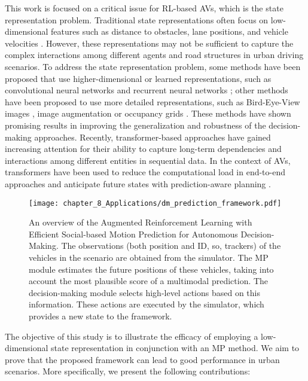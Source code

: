 This work is focused on a critical issue for RL-based AVs, which is the state representation problem. Traditional state representations often focus on low-dimensional features such as distance to obstacles, lane positions, and vehicle velocities \cite{Rodrigo2023}. However, these representations may not be sufficient to capture the complex interactions among different agents and road structures in urban driving scenarios. To address the state representation problem, some methods have been proposed that use higher-dimensional or learned representations, such as convolutional neural networks \cite{Johan2018} and recurrent neural networks \cite{Tram2018}; other methods have been proposed to use more detailed representations, such as  Bird-Eye-View images \cite{zhang2021endtoend}, image augmentation \cite{kostrikov2021image} or occupancy grids \cite{moghadam2019hierarchical}. These methods have shown promising results in improving the generalization and robustness of the decision-making approaches. Recently, transformer-based approaches have gained increasing attention for their ability to capture long-term dependencies and interactions among different entities in sequential data. In the context of AVs, transformers have been used to reduce the computational load in end-to-end approaches \cite{Li4} and anticipate future states with prediction-aware planning \cite{valiente2022predictionaware}.

\begin{figure}[h]
	\centering        
	\texttt{[image: chapter\_8\_Applications/dm\_prediction\_framework.pdf]}
	\caption{An overview of the Augmented Reinforcement Learning with Efficient Social-based Motion Prediction for Autonomous Decision-Making. The observations (both position and ID, so, trackers) of the vehicles in the scenario are obtained from the simulator. The MP module estimates the future positions of these vehicles, taking into account the most plausible score of a multimodal prediction. The decision-making module selects high-level actions based on this information. These actions are executed by the simulator, which provides a new state to the framework. }
	\label{fig:chapter_8_Applications/dm_prediction_framework}
\end{figure}

The objective of this study is to illustrate the efficacy of employing a low-dimensional state representation in conjunction with an MP method. We aim to prove that the proposed framework can lead to good performance in urban scenarios. More specifically, we present the following contributions:


